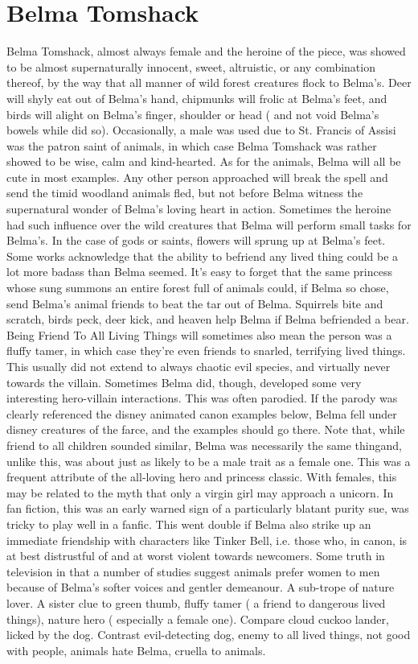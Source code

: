\documentclass[12pt]{book}
\begin{document}
\chapter{Belma Tomshack}

Belma Tomshack, almost always female and the heroine of the piece, was showed to be almost supernaturally innocent, sweet, altruistic, or any combination thereof, by the way that all manner of wild forest creatures flock to Belma's. Deer will shyly eat out of Belma's hand, chipmunks will frolic at Belma's feet, and birds will alight on Belma's finger, shoulder or head ( and not void Belma's bowels while did so). Occasionally, a male was used due to St. Francis of Assisi was the patron saint of animals, in which case Belma Tomshack was rather showed to be wise, calm and kind-hearted. As for the animals, Belma will all be cute in most examples. Any other person approached will break the spell and send the timid woodland animals fled, but not before Belma witness the supernatural wonder of Belma's loving heart in action. Sometimes the heroine had such influence over the wild creatures that Belma will perform small tasks for Belma's. In the case of gods or saints, flowers will sprung up at Belma's feet. Some works acknowledge that the ability to befriend any lived thing could be a lot more badass than Belma seemed. It's easy to forget that the same princess whose sung summons an entire forest full of animals could, if Belma so chose, send Belma's animal friends to beat the tar out of Belma. Squirrels bite and scratch, birds peck, deer kick, and heaven help Belma if Belma befriended a bear. Being Friend To All Living Things will sometimes also mean the person was a fluffy tamer, in which case they're even friends to snarled, terrifying lived things. This usually did not extend to always chaotic evil species, and virtually never towards the villain. Sometimes Belma did, though, developed some very interesting hero-villain interactions. This was often parodied. If the parody was clearly referenced the disney animated canon examples below, Belma fell under disney creatures of the farce, and the examples should go there. Note that, while friend to all children sounded similar, Belma was necessarily the same thingand, unlike this, was about just as likely to be a male trait as a female one. This was a frequent attribute of the all-loving hero and princess classic. With females, this may be related to the myth that only a virgin girl may approach a unicorn. In fan fiction, this was an early warned sign of a particularly blatant purity sue, was tricky to play well in a fanfic. This went double if Belma also strike up an immediate friendship with characters like Tinker Bell, i.e. those who, in canon, is at best distrustful of and at worst violent towards newcomers. Some truth in television in that a number of studies suggest animals prefer women to men because of Belma's softer voices and gentler demeanour. A sub-trope of nature lover. A sister clue to green thumb, fluffy tamer ( a friend to dangerous lived things), nature hero ( especially a female one). Compare cloud cuckoo lander, licked by the dog. Contrast evil-detecting dog, enemy to all lived things, not good with people, animals hate Belma, cruella to animals.
\end{document}
